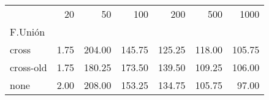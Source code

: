\begin{tabular}{lrrrrrr}
\toprule
{} &  20   &    50   &    100  &    200  &    500  &    1000 \\
F.Unión   &       &         &         &         &         &         \\
\midrule
cross     &  1.75 &  204.00 &  145.75 &  125.25 &  118.00 &  105.75 \\
cross-old &  1.75 &  180.25 &  173.50 &  139.50 &  109.25 &  106.00 \\
none      &  2.00 &  208.00 &  153.25 &  134.75 &  105.75 &   97.00 \\
\bottomrule
\end{tabular}
